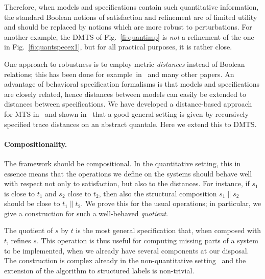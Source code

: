 \documentclass[twocolumn]{svjour3-dummy}
\begin{document}
Therefore, when models and specifications contain such quantitative
information, the standard Boolean notions of satisfaction and refinement
are of limited utility~\cite{DBLP:conf/fm/HenzingerS06,
  DBLP:journals/cejcs/Sifakis11} and should be replaced by notions which
are more robust to perturbations.  For another example, the DMTS of
Fig.~\ref{fi:quantimp} is \emph{not} a refinement of the one in
Fig.~\ref{fi:quantspecex1}, but for all practical purposes, it is rather
close.

One approach to robustness is to employ metric \emph{distances} instead
of Boolean relations; this has been done for example~in~\cite{DBLP:journals/tse/AlfaroFS09,
  DBLP:conf/mfcs/LarsenMP12, DBLP:journals/tcs/DesharnaisGJP04,
  DBLP:journals/tcs/BreugelW05, DBLP:conf/formats/HenzingerMP05,
  DBLP:journals/tcs/CernyHR12, DBLP:conf/forte/Romero-HernandezF12,
  DBLP:conf/wadt/Romero-HernandezF12, DBLP:journals/tcs/AlfaroFHMS05,
  DBLP:conf/concur/Alfaro03 } and many other papers.  An advantage of
behavioral specification formalisms is that models and specifications
are closely related, hence distances between models can easily be
extended to distances between specifications.  We have developed a
distance-based approach for MTS in~\cite{
  DBLP:conf/csr/BauerFLT12,
  DBLP:conf/mfcs/BauerFJLLT11,
  DBLP:journals/acta/FahrenbergL14, DBLP:journals/fmsd/BauerFJLLT13} and
shown in~\cite{DBLP:journals/tcs/FahrenbergL14,
  DBLP:journals/acta/FahrenbergL14,
  DBLP:conf/csr/BauerFLT12,
  DBLP:conf/fsttcs/FahrenbergLT11,
  DBLP:conf/aplas/FahrenbergL13} that a good general setting is given by
recursively specified trace distances on an abstract quantale.  Here we
extend this to DMTS.

\paragraph{Compositionality.}
The framework should be compositional. In the quantitative setting, this
in essence means that the operations we define on the systems should
behave well with respect not only to satisfaction, but also to the
distances. For instance, if $s_1$ is close to $t_1$ and $s_2$ close to
$t_2$, then also the structural composition $s_1\| s_2$ should be close
to $t_1\| t_2$. We prove this for the usual operations; in particular,
we give a construction for such a well-behaved
\emph{quotient}.

The quotient of $s$ by $t$ is the most general specification that, when
composed with $t$, refines $s$. This operation is thus useful for
computing missing parts of a system to be implemented, when we already
have several components at our disposal. The construction is complex
already in the non-quantitative
setting~\cite{DBLP:conf/concur/BenesDFKL13} and the extension of the
algorithm to structured labels is non-trivial.
\end{document}
